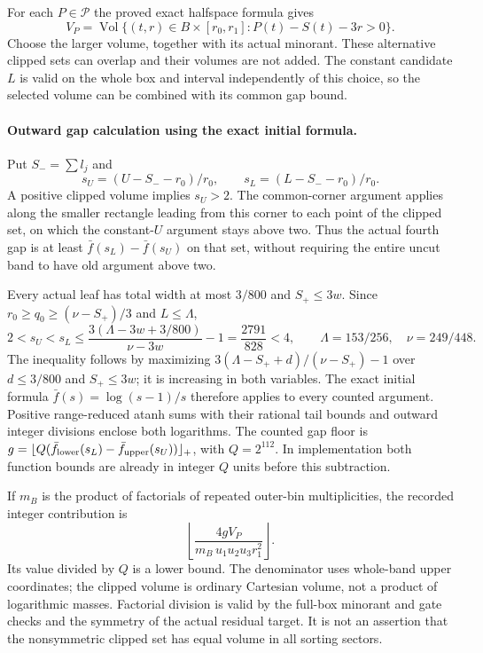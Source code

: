 For each $P\in\mathcal P$ the proved exact halfspace formula gives
\[
 V_P=\operatorname{Vol}\{(t,r)\in B\times[r_0,r_1]:
                          P(t)-S(t)-3r>0\}.
\]
Choose the larger volume, together with its actual minorant. These
alternative clipped sets can overlap and their volumes are not
added. The constant candidate $L$ is valid on the whole box and
interval independently of this choice, so the selected volume can
be combined with its common gap bound.

\paragraph{Outward gap calculation using the exact initial formula.}
Put $S_-=\sum l_j$ and
\[
 s_U=(U-S_--r_0)/r_0,\qquad s_L=(L-S_--r_0)/r_0.
\]
A positive clipped volume implies $s_U>2$. The common-corner
argument applies along the smaller rectangle leading from this
corner to each point of the clipped set, on which the constant-$U$
argument stays above two. Thus the actual fourth gap is at least
$\bar f(s_L)-\bar f(s_U)$ on that set, without requiring the
entire uncut band to have old argument above two.

Every actual leaf has total width at most $3/800$ and
$S_+\le3w$. Since $r_0\ge q_0\ge(\nu-S_+)/3$ and $L\le\Lambda$,
\[
 2<s_U<s_L\le
 \frac{3(\Lambda-3w+3/800)}{\nu-3w}-1
 =\frac{2791}{828}<4,
 \qquad \Lambda=153/256,\quad\nu=249/448.
\]
The inequality follows by maximizing
$3(\Lambda-S_++d)/(\nu-S_+)-1$ over $d\le3/800$ and
$S_+\le3w$; it is increasing in both variables. The exact initial
formula $\bar f(s)=\log(s-1)/s$ therefore applies to every counted
argument. Positive range-reduced atanh sums with their rational
tail bounds and outward integer divisions enclose both logarithms.
The counted gap floor is
$g=\lfloor Q(\bar f_{\rm lower}(s_L)-\bar f_{\rm upper}(s_U))\rfloor_+$,
with $Q=2^{112}$. In implementation both function bounds are already
in integer $Q$ units before this subtraction.

If $m_B$ is the product of factorials of repeated outer-bin
multiplicities, the recorded integer contribution is
\[
 \left\lfloor
 \frac{4gV_P}{m_B\,u_1u_2u_3r_1^2}
 \right\rfloor.
\]
Its value divided by $Q$ is a lower bound. The denominator uses
whole-band upper coordinates; the clipped volume is ordinary
Cartesian volume, not a product of logarithmic masses. Factorial
division is valid by the full-box minorant and gate checks and the
symmetry of the actual residual target. It is not an assertion that
the nonsymmetric clipped set has equal volume in all sorting sectors.

